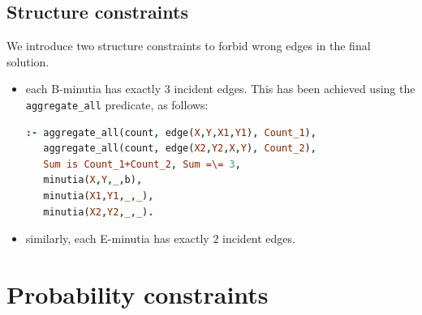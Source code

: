 \documentclass[8pt]{article}
\begin{document}
\subsection{Structure constraints}
We introduce two structure constraints to forbid wrong edges
in the final solution.
\begin{itemize}
  \item
    each B-minutia has exactly $3$ incident edges. This has been achieved
    using the \texttt{aggregate\_all} predicate, as follows:
      \begin{lstlisting}[language=Prolog,frame = single]
:- aggregate_all(count, edge(X,Y,X1,Y1), Count_1),
   aggregate_all(count, edge(X2,Y2,X,Y), Count_2),
   Sum is Count_1+Count_2, Sum =\= 3,
   minutia(X,Y,_,b),
   minutia(X1,Y1,_,_),
   minutia(X2,Y2,_,_).
      \end{lstlisting}
  \item
    similarly, each E-minutia has exactly $2$ incident edges.
\end{itemize}

\section{Probability constraints}
\end{document}
